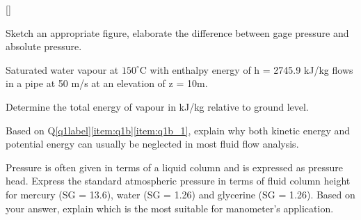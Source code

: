 
%




\question{}[\label{q1label}]

\listbeginx	%
	\item \label{item:q1a} Sketch an appropriate figure, elaborate the difference between gage pressure and absolute pressure.
	

	
	\item \label{item:q1b} Saturated water vapour at $150^{\circ}$C with enthalpy energy of h = 2745.9 kJ/kg flows in a pipe at 50 m/s at an elevation of z = 10m.
		
		
		\listbegin 
		\item\label{item:q1b_1} Determine the total energy of vapour in kJ/kg relative to ground level.
		
		
		
		
		\item Based on Q\ref{q1label}\ref{item:q1b}\ref{item:q1b_1}, explain why both kinetic energy and potential energy can usually be neglected in most fluid flow analysis.
		
		
		
		\listclose
		
		\item Pressure is often given in terms of a liquid column and is expressed as pressure head. Express the standard atmospheric pressure in terms of fluid column height for mercury (SG = 13.6), water (SG = 1.26) and glycerine (SG = 1.26). Based on your answer, explain which is the most suitable for manometer's application.
		

